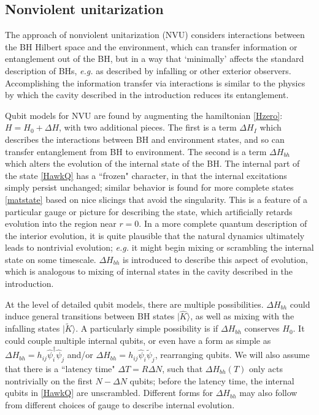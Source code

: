 \documentclass[12pt]{article}
\numberwithin{equation}{section}
\begin{document}
\subsection{Nonviolent unitarization}

The approach of nonviolent unitarization \cite{SGmodels,NVNL,NVUEFT,NVNLT,NVU,BHQU} (NVU)  considers interactions between the BH Hilbert space and the environment, which can transfer information or entanglement out of the BH, but in a way that `minimally' affects the standard description of BHs, {\it e.g.} as described by infalling or other exterior observers.  Accomplishing the information transfer via interactions is similar to the physics by which the cavity described in the introduction reduces its entanglement.

Qubit models for NVU are found by augmenting the hamiltonian \eqref{Hzero}: $H=H_0+\Delta H$, with two additional pieces.  The first is a term $\Delta H_I$ which describes the interactions between BH and environment states, and so can transfer entanglement from BH to environment.  The second is a term $\Delta H_{bh}$ which alters the evolution of the internal state of the BH.  The internal part of the state \eqref{HawkQ} has a ``frozen" character, in that the internal excitations simply persist unchanged; similar behavior is found for more complete states \eqref{matstate} based on nice slicings that avoid the singularity\cite{SEHS,SE2d,GiPe1}.  This is a feature of a particular gauge or picture for describing the state, which artificially retards evolution into the region near $r=0$.  In a more complete quantum description of the interior evolution, it is quite plausible that the natural dynamics ultimately leads to nontrivial evolution; {\it e.g.} it might begin mixing or scrambling the internal state on some timescale.  $\Delta H_{bh}$ is introduced to describe this aspect of evolution, which is analogous to mixing of internal states in the cavity described in the introduction.

At the level of detailed qubit models, there are multiple possibilities.  $\Delta H_{bh}$ could induce general transitions  between BH states $|\hat K\rangle$, as well as mixing with the infalling states 
 $|\tilde K\rangle$.  A particularly simple possibility is if $\Delta H_{bh}$ conserves $H_0$.  It could couple multiple internal qubits, or even have a form as simple as $\Delta H_{bh}=h_{ij} \hat \psi^\dagger_i \hat \psi_j$ and/or $\Delta H_{bh}=h_{ij} \hat \psi_i \tilde \psi_j$, rearranging qubits.  We will also assume that there is a ``latency time" $\Delta T= R\Delta N$, such that $\Delta H_{bh}(T)$ only acts nontrivially on the first $N-\Delta N$ qubits; before the latency time, the internal qubits in \eqref{HawkQ} are unscrambled.  Different forms for $\Delta H_{bh}$ may also follow from different choices of gauge to describe internal evolution.  
\end{document}
